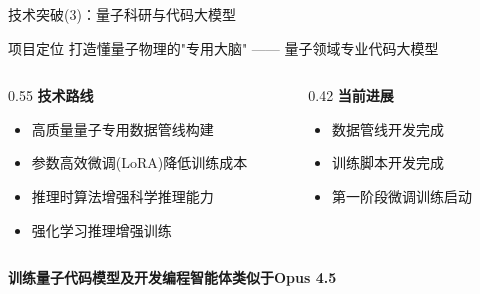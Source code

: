 \documentclass[aspectratio=169,11pt]{beamer}
\begin{document}
\begin{frame}{技术突破(3)：量子科研与代码大模型}
    \begin{block}{项目定位}
        打造懂量子物理的"专用大脑" —— 量子领域专业代码大模型
    \end{block}
    
    \vspace{0.3cm}
    
    \begin{columns}[T]
        \begin{column}{0.55\textwidth}
            \textbf{技术路线}
            \begin{itemize}
                \item 高质量量子专用数据管线构建
                \item 参数高效微调(LoRA)降低训练成本
                \item 推理时算法增强科学推理能力
                \item 强化学习推理增强训练
            \end{itemize}
        \end{column}
        \begin{column}{0.42\textwidth}
            \textbf{当前进展}
            \begin{itemize}
                \item[$\checkmark$] 数据管线开发完成
                \item[$\checkmark$] 训练脚本开发完成
                \item[$\circ$] 第一阶段微调训练启动
            \end{itemize}
        \end{column}
    \end{columns}
    
    \vspace{0.3cm}
    \begin{center}
        \colorbox{cmccgreen!20}{\textbf{训练量子代码模型及开发编程智能体类似于Opus 4.5}}
    \end{center}
\end{frame}



\end{document}
